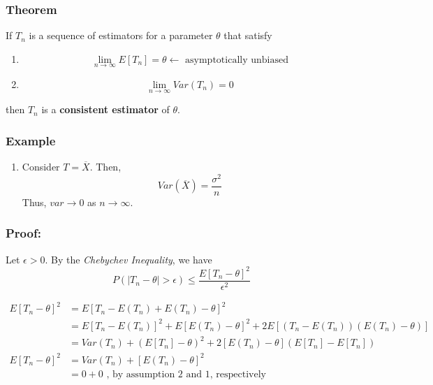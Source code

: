 \documentclass{article}
\begin{document}
\subsubsection{Theorem}
If $T_n$ is a sequence of estimators for a parameter $\theta$ that satisfy
\begin{enumerate}
    \item \begin{equation*}
        \lim_{n\to\infty} E[T_n] = \theta \leftarrow \text{ asymptotically unbiased}
    \end{equation*}
    \item \begin{equation*}
        \lim_{n\to\infty} Var(T_n) = 0
    \end{equation*}
\end{enumerate}
then $T_n$ is a \textbf{consistent estimator} of $\theta$.
\subsubsection*{Example}
\begin{enumerate}
    \item Consider $T = \overline{X}$. Then,
    \begin{equation*}
    Var(\overline{X}) = \frac{\sigma^2}{n}
\end{equation*}
    Thus, $var \to 0$ as $n \to \infty$.
\end{enumerate}

\subsubsection*{Proof:}
Let $\epsilon > 0$. By the \textit{Chebychev Inequality}, we have
\begin{equation*}
    P(|T_n - \theta| > \epsilon) \leq \frac{E[T_n - \theta]^2}{\epsilon^2}
\end{equation*}

\begin{equation*}
    \begin{split}
        E[T_n-\theta]^2 &= E[T_n - E(T_n) + E(T_n) - \theta ] ^2\\
        &= E[T_n - E(T_n)]^2 + E[E(T_n)-\theta]^2 + 2E[(T_n - E(T_n))(E(T_n)-\theta)]\\
        &= Var(T_n) + \left(E[T_n] - \theta \right)^2 + 2[E(T_n)-\theta](E[T_n]-E[T_n])\\
        E[T_n-\theta]^2 &= Var(T_n) + [E(T_n)-\theta]^2\\
        &= 0 + 0 \text{ , by assumption 2 and 1, respectively}
    \end{split}
\end{equation*}
\end{document}
